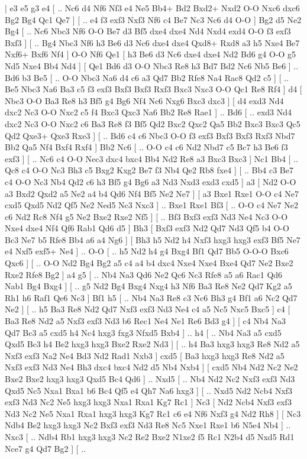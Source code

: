 \makegametitle 
|   e3   e5    g3   e4 [ .. Nc6  d4 Nf6  Nf3 e4  Ne5 Bb4+  Bd2 Bxd2+  Nxd2 O-O  Nxc6 dxc6  Bg2 Bg4  Qc1 Qe7   ]  [ .. e4  f3 exf3  Nxf3 Nf6  c4 Be7  Nc3 Nc6  d4 O-O   ]  Bg2   d5    Ne2   Bg4 [ .. Nc6  Nbc3 Nf6  O-O Be7  d3 Bf5  dxe4 dxe4  Nd4 Nxd4  exd4 O-O  f3 exf3  Bxf3   ]  [ .. Bg4  Nbc3 Nf6  h3 Be6  d3 Nc6  dxe4 dxe4  Qxd8+ Rxd8  a3 h5  Nxe4 Be7  Nxf6+ Bxf6  Nf4   ]  O-O   Nf6    Qe1 [  h3 Be6  d3 Nc6  dxe4 dxe4  Nd2 Bd6  g4 O-O  g5 Nd5  Nxe4 Bb4  Nd4   ]  [  Qe1 Bd6  d3 O-O  Nbc3 Re8  h3 Bd7  Bd2 Nc6  Nb5 Be6   ] .. Bd6    b3   Be5 [ .. O-O  Nbc3 Na6  d4 c6  a3 Qd7  Bb2 Rfe8  Na4 Rac8  Qd2 c5   ]  [ .. Be5  Nbc3 Na6  Ba3 c5  f3 exf3  Bxf3 Bxf3  Rxf3 Bxc3  Nxc3 O-O  Qc1 Re8  Rf4   ]  d4 [  Nbc3 O-O  Ba3 Re8  h3 Bf5  g4 Bg6  Nf4 Nc6  Nxg6 Bxc3  dxc3   ]  [  d4 exd3  Nd4 dxc2  Nc3 O-O  Nxc2 c5  f4 Bxc3  Qxc3 Na6  Bb2 Re8  Rae1   ] .. Bd6 [ .. exd3  Nd4 dxc2  Nc3 O-O  Nxc2 c6  Ba3 Re8  f3 Bf5  Qd2 Bxc2  Qxc2 Qa5  Bb2 Bxc3  Bxc3 Qc5  Qd2 Qxe3+  Qxe3 Rxe3   ]  [ .. Bd6  c4 c6  Nbc3 O-O  f3 exf3  Bxf3 Bxf3  Rxf3 Nbd7  Bb2 Qa5  Nf4 Bxf4  Rxf4   ]  Bb2   Nc6 [ .. O-O  c4 c6  Nd2 Nbd7  c5 Bc7  h3 Be6  f3 exf3   ]  [ .. Nc6  c4 O-O  Nec3 dxc4  bxc4 Bb4  Nd2 Re8  a3 Bxc3  Bxc3   ]  Nc1   Bb4 [ .. Qc8  c4 O-O  Nc3 Bh3  c5 Bxg2  Kxg2 Be7  f3 Nb4  Qe2 Rb8  fxe4   ]  [ .. Bb4  c3 Be7  c4 O-O  Nc3 Nb4  Qd2 c6  h3 Bf5  g4 Bg6  a3 Nd3  Nxd3 exd3  cxd5   ]  a3 [  Nd2 O-O  a3 Bxd2  Qxd2 a5  Ne2 a4  b4 Qd6  Nf4 Bf5  Ne2 Ne7   ]  [  a3 Bxe1  Rxe1 O-O  c4 Ne7  cxd5 Qxd5  Nd2 Qf5  Ne2 Ned5  Nc3 Nxc3   ] .. Bxe1    Rxe1   Bf3 [ .. O-O  c4 Ne7  Ne2 c6  Nd2 Rc8  Nf4 g5  Ne2 Bxe2  Rxe2 Nf5   ]  [ .. Bf3  Bxf3 exf3  Nd3 Ne4  Nc3 O-O  Nxe4 dxe4  Nf4 Qf6  Rab1 Qd6  d5   ]  Bh3 [  Bxf3 exf3  Nd2 Qd7  Nd3 Qf5  b4 O-O  Bc3 Ne7  b5 Rfe8  Bb4 a6  a4 Ng6   ]  [  Bh3 h5  Nd2 h4  Nxf3 hxg3  hxg3 exf3  Bf5 Ne7  e4 Nxf5  exf5+ Ne4   ] .. O-O [ .. h5  Nd2 h4  g4 Bxg4  Bf1 Qd7  Bb5 O-O-O  Bxc6 Qxc6   ]  [ .. O-O  Nd2 Bg4  Bg2 a5  c4 a4  b4 dxc4  Nxe4 Nxe4  Bxe4 Qd7  Ne2 Bxe2  Rxe2 Rfe8  Bg2   ]  a4   g5 [ .. Nb4  Na3 Qd6  Ne2 Qc6  Nc3 Rfe8  a5 a6  Rac1 Qd6  Nab1 Bg4  Bxg4   ]  [ .. g5  Nd2 Bg4  Bxg4 Nxg4  h3 Nf6  Ba3 Re8  Ne2 Qd7  Kg2 a5  Rh1 h6  Raf1 Qe6  Nc3   ]  Bf1   h5 [ .. Nb4  Na3 Re8  c3 Nc6  Bh3 g4  Bf1 a6  Nc2 Qd7  Ne2   ]  [ .. h5  Ba3 Re8  Nd2 Qd7  Nxf3 exf3  Nd3 Ne4  c4 a5  Nc5 Nxc5  Bxc5   ]  c4 [  Ba3 Re8  Nd2 a5  Nxf3 exf3  Nd3 b6  Rec1 Ne4  Ne1 Re6  Bd3 g4   ]  [  c4 Nb4  Na3 Qd7  Bc3 a5  cxd5 h4  Nc4 hxg3  fxg3 Nfxd5  Bxb4   ] .. h4 [ .. Nb4  Na3 a5  cxd5 Qxd5  Bc3 h4  Be2 hxg3  hxg3 Bxe2  Rxe2 Nd3   ]  [ .. h4  Ba3 hxg3  hxg3 Re8  Nd2 a5  Nxf3 exf3  Na2 Ne4  Bd3 Nd2  Rad1 Nxb3   ]  cxd5 [  Ba3 hxg3  hxg3 Re8  Nd2 a5  Nxf3 exf3  Nd3 Ne4  Bh3 dxc4  bxc4 Nd2  d5 Nb4  Nxb4   ]  [  cxd5 Nb4  Nd2 Nc2  Ne2 Bxe2  Bxe2 hxg3  hxg3 Qxd5  Bc4 Qd6   ] .. Nxd5 [ .. Nb4  Nd2 Nc2  Nxf3 exf3  Nd3 Qxd5  Nc5 Nxa1  Bxa1 b6  Bc4 Qf5  e4 Qh7  Na6 hxg3   ]  [ .. Nxd5  Nd2 Ncb4  Nxf3 exf3  Nd3 Nc2  Ne5 hxg3  hxg3 Nxa1  Rxa1 Kg7  Rc1   ]  Nc3 [  Nd2 Ncb4  Nxf3 exf3  Nd3 Nc2  Ne5 Nxa1  Rxa1 hxg3  hxg3 Kg7  Rc1 c6  e4 Nf6  Nxf3 g4  Nd2 Rh8   ]  [  Nc3 Ndb4  Be2 hxg3  hxg3 Nc2  Bxf3 exf3  Nd3 Re8  Nc5 Nxe1  Rxe1 b6  N5e4 Nb4   ] .. Nxc3 [ .. Ndb4  Rb1 hxg3  hxg3 Nc2  Re2 Bxe2  N1xe2 f5  Rc1 N2b4  d5 Nxd5  Rd1 Nce7  g4 Qd7  Bg2   ]  [ .. 
